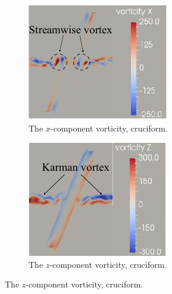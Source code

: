 \documentclass[a4paper,fleqn]{cas-sc}
\begin{document}
\begin{figure}
  \centering
  \begin{subfigure}[h]{0.28\textwidth}
    \includegraphics[width=\textwidth]{figs/vorx675}
    \caption{The $x$-component vorticity, \angfo{} cruciform.}
    \label{fig:vorx675}
  \end{subfigure}
  \hspace{6mm}
  \begin{subfigure}[h]{0.28\textwidth}
    \includegraphics[width=\textwidth]{figs/vorz675}
    \caption{The $z$-component vorticity, \angfo{} cruciform.}
    \label{fig:vorz675}
  \end{subfigure}


\end{figure}
\end{document}
